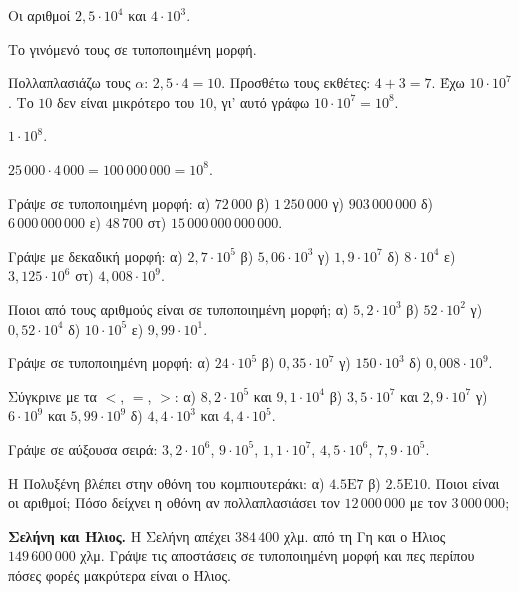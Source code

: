 \tixero Οι αριθμοί $2{,}5\cdot10^4$ και $4\cdot10^3$.\par
\tithelo Το γινόμενό τους σε τυποποιημένη μορφή.\par
\possindeo Πολλαπλασιάζω τους $\alpha$: $2{,}5\cdot4=10$. Προσθέτω τους εκθέτες: $4+3=7$. Έχω $10\cdot10^7$. Το $10$ δεν είναι μικρότερο του $10$, γι' αυτό γράφω $10\cdot10^7=10^8$.\par
\apantisi $1\cdot10^8$.\par
\elegxos $25\,000\cdot4\,000=100\,000\,000=10^8$.



\ex Γράψε σε τυποποιημένη μορφή: α) $72\,000$ \quad β) $1\,250\,000$ \quad γ) $903\,000\,000$ \quad δ) $6\,000\,000\,000$ \quad ε) $48\,700$ \quad στ) $15\,000\,000\,000\,000$.

\ex Γράψε με δεκαδική μορφή: α) $2{,}7\cdot10^5$ \quad β) $5{,}06\cdot10^3$ \quad γ) $1{,}9\cdot10^7$ \quad δ) $8\cdot10^4$ \quad ε) $3{,}125\cdot10^6$ \quad στ) $4{,}008\cdot10^9$.

\ex Ποιοι από τους αριθμούς είναι σε τυποποιημένη μορφή; α) $5{,}2\cdot10^3$ \quad β) $52\cdot10^2$ \quad γ) $0{,}52\cdot10^4$ \quad δ) $10\cdot10^5$ \quad ε) $9{,}99\cdot10^1$.

\ex Γράψε σε τυποποιημένη μορφή: α) $24\cdot10^5$ \quad β) $0{,}35\cdot10^7$ \quad γ) $150\cdot10^3$ \quad δ) $0{,}008\cdot10^9$.

\ex Σύγκρινε με τα $<$, $=$, $>$: α) $8{,}2\cdot10^5$ και $9{,}1\cdot10^4$ \quad β) $3{,}5\cdot10^7$ και $2{,}9\cdot10^7$ \quad γ) $6\cdot10^9$ και $5{,}99\cdot10^9$ \quad δ) $4{,}4\cdot10^3$ και $4{,}4\cdot10^5$.

\ex Γράψε σε αύξουσα σειρά: $3{,}2\cdot10^6$, $9\cdot10^5$, $1{,}1\cdot10^7$, $4{,}5\cdot10^6$, $7{,}9\cdot10^5$.

\ex Η Πολυξένη βλέπει στην οθόνη του κομπιουτεράκι: α) $4.5\mathrm{E}7$ \quad β) $2.5\mathrm{E}10$. Ποιοι είναι οι αριθμοί; Πόσο δείχνει η οθόνη αν πολλαπλασιάσει τον $12\,000\,000$ με τον $3\,000\,000$;


\ex \textbf{Σελήνη και Ήλιος.} Η Σελήνη απέχει $384\,400$ χλμ. από τη Γη και ο Ήλιος $149\,600\,000$ χλμ. Γράψε τις αποστάσεις σε τυποποιημένη μορφή και πες περίπου πόσες φορές μακρύτερα είναι ο Ήλιος.

